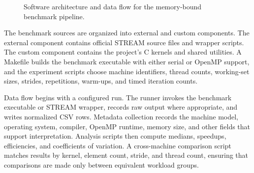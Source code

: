 \documentclass[11pt]{article}
\begin{document}
\begin{figure}[htbp]
\centering
{}
\caption{Software architecture and data flow for the memory-bound benchmark pipeline.}
\label{fig:architecture}
\end{figure}

The benchmark sources are organized into external and custom components. The external component contains official STREAM source files and wrapper scripts. The custom component contains the project's C kernels and shared utilities. A Makefile builds the benchmark executable with either serial or OpenMP support, and the experiment scripts choose machine identifiers, thread counts, working-set sizes, strides, repetitions, warm-ups, and timed iteration counts.

Data flow begins with a configured run. The runner invokes the benchmark executable or STREAM wrapper, records raw output where appropriate, and writes normalized CSV rows. Metadata collection records the machine model, operating system, compiler, OpenMP runtime, memory size, and other fields that support interpretation. Analysis scripts then compute medians, speedups, efficiencies, and coefficients of variation. A cross-machine comparison script matches results by kernel, element count, stride, and thread count, ensuring that comparisons are made only between equivalent workload groups.
\end{document}
